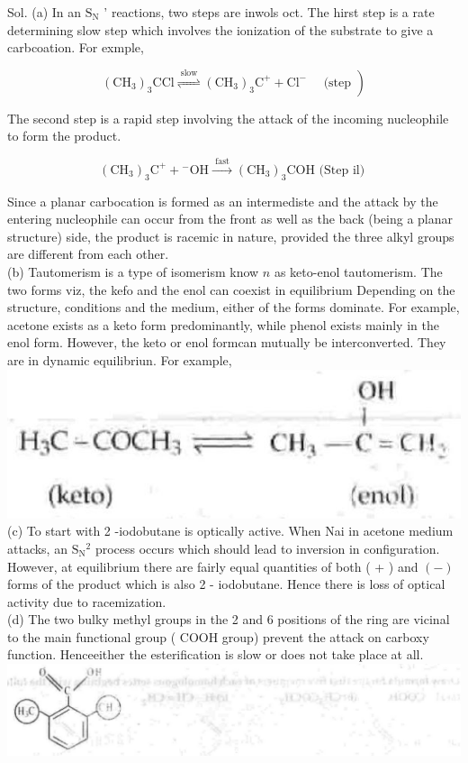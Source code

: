 \documentclass[10pt]{article}
\begin{document}
Sol. (a) In an $\mathrm{S}_{\mathrm{N}}$ ' reactions, two steps are inwols oct. The hirst step is a rate determining slow step which involves the ionization of the substrate to give a carbcoation. For exmple,

$$
\left.\left(\mathrm{CH}_{3}\right)_{3} \mathrm{CCl} \stackrel{\text { slow }}{\rightleftharpoons}\left(\mathrm{CH}_{3}\right)_{3} \mathrm{C}^{+}+\mathrm{Cl}^{-} \quad \text { (step }\right)
$$

The second step is a rapid step involving the attack of the incoming nucleophile to form the product.

$$
\left(\mathrm{CH}_{3}\right)_{3} \mathrm{C}^{+}+{ }^{-} \mathrm{OH} \xrightarrow{\text { fast }}\left(\mathrm{CH}_{3}\right)_{3} \mathrm{COH} \text { (Step il) }
$$

Since a planar carbocation is formed as an intermediste and the attack by the entering nucleophile can occur from the front as well as the back (being a planar structure) side, the product is racemic in nature, provided the three alkyl groups are different from each other.\\
(b) Tautomerism is a type of isomerism know $n$ as keto-enol tautomerism. The two forms viz, the kefo and the enol can coexist in equilibrium Depending on the structure, conditions and the medium, either of the forms dominate. For example, acetone exists as a keto form predominantly, while phenol exists mainly in the enol form. However, the keto or enol formcan mutually be interconverted. They are in dynamic equilibriun. For example,\\
\includegraphics[max width=\textwidth, center]{2025_01_28_8470952b98110cec3aabg-120(1)}\\
(c) To start with 2 -iodobutane is optically active. When Nai in acetone medium attacks, an $\mathrm{S}_{\mathrm{N}}{ }^{2}$ process occurs which should lead to inversion in configuration. However, at equilibrium there are fairly equal quantities of both ( + ) and $(-)$ forms of the product which is also 2 - iodobutane. Hence there is loss of optical activity due to racemization.\\
(d) The two bulky methyl groups in the 2 and 6 positions of the ring are vicinal to the main functional group ( COOH group) prevent the attack on carboxy function. Henceeither the esterification is slow or does not take place at all.\\
\includegraphics[max width=\textwidth, center]{2025_01_28_8470952b98110cec3aabg-120(2)}
\end{document}
